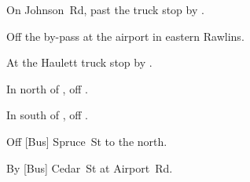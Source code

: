 
\begin{LocationList}

On Johnson~Rd, past the truck stop by   .

Off the  by-pass at the airport in eastern Rawlins.

At the Haulett truck stop by   .

In  north of , off   .

In  south of , off   .

Off [Bus]  Spruce~St to the north.

By [Bus]  Cedar~St at Airport~Rd.

\end{LocationList}
